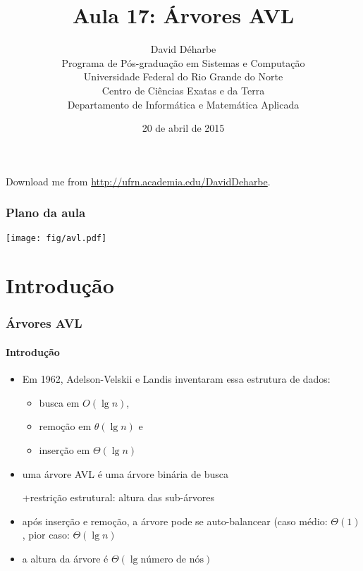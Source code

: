 \documentclass{beamer}
\title{Aula 17: Árvores AVL}
\author{David Déharbe \\
  Programa de Pós-graduação em Sistemas e Computação \\
  Universidade Federal do Rio Grande do Norte \\
  Centro de Ciências Exatas e da Terra \\
  Departamento de Informática e Matemática Aplicada}
\date{20 de abril de 2015}
\begin{document}
\begin{frame}
  \titlepage
  Download me from \url{http://ufrn.academia.edu/DavidDeharbe}.
\end{frame}

\begin{frame}
  \frametitle{Plano da aula}


  \begin{center}
    \texttt{[image: fig/avl.pdf]}
  \end{center}

  \tableofcontents

\end{frame}

\section{Introdução}

\begin{frame}

  \frametitle{Árvores AVL}
  \framesubtitle{Introdução}

  
  \begin{itemize}
    
  \item Em 1962, Adelson-Velskii e Landis inventaram essa estrutura de dados:
    \begin{itemize}
    \item busca em $O(\lg n)$, 
    \item remoção em $\theta(\lg n)$ e
    \item inserção em $\Theta(\lg n)$
    \end{itemize}

  \item uma \alert{árvore AVL} é uma árvore binária de busca 

  +restrição estrutural: altura das sub-árvores

  \item após inserção e remoção, a árvore pode se auto-balancear (caso médio:
    $\Theta(1)$, pior caso: $\Theta(\lg n)$
    
  \item a altura da árvore é $\Theta(\lg \text{número de nós})$

  \end{itemize}

\end{frame}
\end{document}
